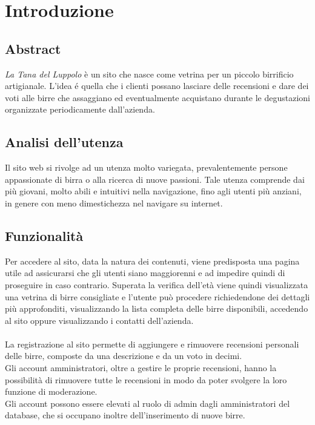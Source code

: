 \section{Introduzione}
\subsection{Abstract}
\textit{La Tana del Luppolo} è un sito che nasce come vetrina per un piccolo birrificio artigianale. L'idea é quella che i clienti possano lasciare delle recensioni e dare dei voti alle birre che assaggiano ed eventualmente acquistano durante le degustazioni organizzate periodicamente dall'azienda.
\subsection{Analisi dell'utenza}
Il sito web si rivolge ad un utenza molto variegata, prevalentemente persone appassionate di birra o alla ricerca di nuove passioni. Tale utenza comprende dai più giovani, molto abili e intuitivi nella navigazione, fino agli utenti più anziani, in genere con meno dimestichezza nel navigare su internet.

\subsection{Funzionalità}
Per accedere al sito, data la natura dei contenuti, viene predisposta una pagina utile ad assicurarsi che gli utenti siano maggiorenni e ad impedire quindi di proseguire in caso contrario. Superata la verifica dell'età viene quindi visualizzata una vetrina di birre consigliate e l'utente può procedere richiedendone dei dettagli più approfonditi, visualizzando la lista completa delle birre disponibili, accedendo al sito oppure visualizzando i contatti dell'azienda.\\ \\
La registrazione al sito permette di aggiungere e rimuovere recensioni personali delle birre, composte da una descrizione e da un voto in decimi.\\
Gli account amministratori, oltre a gestire le proprie recensioni, hanno la possibilità di rimuovere tutte le recensioni in modo da poter svolgere la loro funzione di moderazione.\\
Gli account possono essere elevati al ruolo di admin dagli amministratori del database, che si occupano inoltre dell'inserimento di nuove birre.

